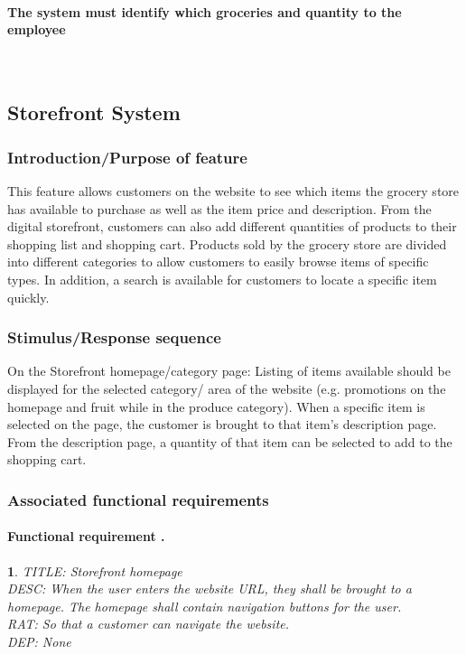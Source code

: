 \documentclass{scrreprt}
\theoremstyle{funreq}
\newtheorem{funreq}{}
\begin{document}
\paragraph[]{\normalfont The system must identify which groceries and quantity to the employee}
~\\


\subsection{Storefront System}
\subsubsection{Introduction/Purpose of feature}
This feature allows customers on the website to see which items the grocery store has available to purchase as well as the item price and description.  From the digital storefront, customers can also add different quantities of products to their shopping list and shopping cart.  Products sold by the grocery store are divided into different categories to allow customers to easily browse items of specific types.  In addition, a search is available for customers to locate a specific item quickly.
\subsubsection{Stimulus/Response sequence}
On the Storefront homepage/category page: Listing of items available should be displayed for the selected category/ area of the website (e.g. promotions on the homepage and fruit while in the produce category).  When a specific item is selected on the page, the customer is brought to that item’s description page.  From the description page, a quantity of that item can be selected to add to the shopping cart.  
\subsubsection{Associated functional requirements}

\paragraph[]{Functional requirement .}
\begin{funreq}
	\label{store_home}
	TITLE: Storefront homepage\\
	DESC: When the user enters the website URL, they shall be brought to a homepage.  The homepage shall contain navigation buttons for the user.\\
	RAT: So that a customer can navigate the website.\\
	DEP: None\\
\end{funreq}
\end{document}
